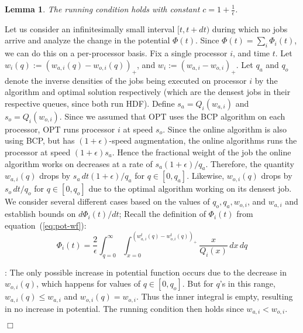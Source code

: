 \documentclass[11pt]{article}
\newtheorem{lemma}{Lemma}[section]
\newenvironment{proof}{\vspace{-0.15in}\noindent{\bf Proof:}}{\hspace*{\fill}$\Box$\par}
\newcommand{\opt}{\textrm{\sc OPT}\xspace}
\newcommand{\bcp}{{\sf BCP}\xspace}
\newcommand{\const}{\frac{2}{\epsilon}}
\newcommand{\dphidtside}{d \Phi_i(t)/dt}
\begin{document}
\begin{lemma}
  \label{lem:running-wtd}
The running condition holds with constant $c=1+\frac{1}{\epsilon}$.
\end{lemma}


\begin{proof}
Let us consider an infinitesimally small interval $[t, t+dt)$ during
which no jobs arrive and analyze the change in the potential $\Phi(t)$.
Since $\Phi(t) = \sum_i \Phi_i(t)$, we can do this on a per-processor
basis. Fix a single processor $i$, and time $t$.
Let $w_i(q) := (w_{a,i}(q) - w_{o,i}(q))_+$, and
$w_i := (w_{a,i} - w_{o,i})_+$.
Let $q_a$ and $q_o$ denote the inverse densities of the jobs being
executed on processor $i$ by the algorithm and optimal solution
respectively (which are the densest jobs in their respective queues,
since both run HDF). Define $s_a = Q_i(w_{a,i})$ and $s_o =
Q_i(w_{o,i})$. Since we assumed that \opt uses the \bcp algorithm on each
processor,  \opt runs processor $i$ at speed $s_o$.
Since the online algorithm is also using \bcp, but has
$(1+\epsilon)$-speed augmentation, the online algorithms
runs the processor at speed
$(1+\epsilon) s_a$. Hence the
fractional weight of the job the online algorithm works on decreases at
a rate of $s_a (1+\epsilon)/ q_a$.  Therefore, the quantity
$w_{a,i}(q)$ drops by $s_a \,dt (1+\epsilon)/ q_a$ for $q \in [0, q_a]$.
Likewise, $w_{o,i}(q)$ drops by $s_o \,dt/q_o$ for $q \in [0, q_o]$ due to
the optimal algorithm working on its densest job. We consider
several different cases based on the values of $q_o, q_a, w_{o,i}$, and $w_{a,i}$ and establish bounds on $\dphidtside$;
Recall the definition of $\Phi_i(t)$
from equation~(\ref{eq:pot-wf}):
\begin{equation*}
  \Phi_i(t) = \const \int_{q=0}^{\infty} \int_{x=0}^{(w_{a,i}^{t}(q) -
    w_{o,i}^{t}(q))_+} \frac{x}{Q_i(x)} \,dx\,dq
\end{equation*}


\medskip {}:
The only
possible increase in potential function occurs due to the decrease in
$w_{o,i}(q)$, which happens for values of $q \in [0, q_o]$.
But for $q$'s in this range, $w_{a,i}(q) \le w_{a,i}$ and $w_{o,i}(q) = w_{o,i}$.
Thus the inner integral is empty, resulting in no increase in potential.
The running condition then holds since $w_{a,i} < w_{o,i}$.


\end{proof}
\end{document}
